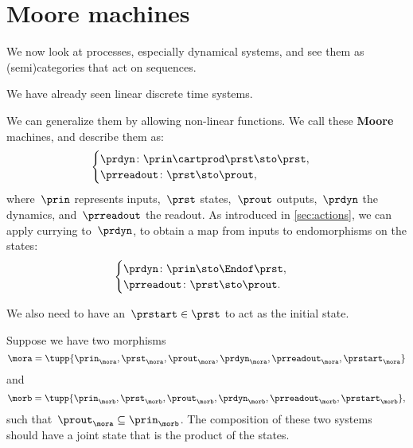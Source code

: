 
\section{Moore machines}
\label{sec:moore-machines}

We now look at processes, especially dynamical systems, and see them as (semi)\-categories that act on sequences.

We have already seen linear discrete time systems.

We can generalize them by allowing non-linear functions.
We call these \textbf{Moore} machines, and describe them as:
%
\begin{equation}
    \label{eq:moore-1}
    \begin{cases}
        \prdyn \colon \prin \cartprod \prst \sto \prst, \\
        \prreadout \colon \prst \sto \prout,
    \end{cases}
\end{equation}
%
where~$\prin$ represents inputs,~$\prst$ states,~$\prout$ outputs,~$\prdyn$ the dynamics, and~$\prreadout$ the readout.
As introduced in \cref{sec:actions}, we can apply currying to~$\prdyn$, to obtain a map from inputs to endomorphisms on the states:
%
\begin{equation}
    \label{eq:moore-1-endo}
    \begin{cases}
        \prdyn \colon \prin \sto \Endof \prst, \\
        \prreadout \colon \prst \sto \prout.
    \end{cases}
\end{equation}
%

We also need to have an~$\prstart \in \prst$ to act as the initial state.

Suppose we have two morphisms
%
\begin{equation}
    \label{eq:moore-mora}
    \mora = \tupp{\prin_{\mora},\prst_{\mora},\prout_{\mora},\prdyn_{\mora},\prreadout_{\mora},\prstart_{\mora}}
\end{equation}
%
and
%
\begin{equation}
    \label{eq:moore-morb}
    \morb = \tupp{\prin_{\morb},\prst_{\morb},\prout_{\morb},\prdyn_{\morb},\prreadout_{\morb},\prstart_{\morb}},
\end{equation}
such that~$\prout_{\mora} \subseteq \prin_{\morb}$.
The composition of these two systems should have a joint state that is the product of the states.

